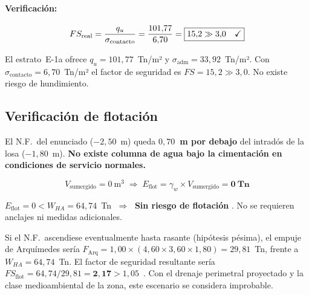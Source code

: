 \paragraph{Verificación:}
\begin{equation}
  FS_\text{real} = \frac{q_u}{\sigma_\text{contacto}}
    = \frac{101{,}77}{6{,}70}
    = \boxed{15{,}2 \gg 3{,}0 \quad \checkmark}
  \label{eq:fs_cp_arqueta}
\end{equation}

\begin{resultadobox}
  El estrato~E-1a ofrece $q_u=101{,}77$~Tn/m² y $\sigma_\text{adm}=33{,}92$~Tn/m².
  Con $\sigma_\text{contacto}=6{,}70$~Tn/m² el factor de seguridad es $FS=15{,}2\gg3{,}0$.
  No existe riesgo de hundimiento.
\end{resultadobox}

\subsection{Verificación de flotación}
\label{subsec:flotacion}

El N.F.\ del enunciado ($-2{,}50$~m) queda \textbf{$0{,}70$~m por debajo}
del intradós de la losa ($-1{,}80$~m). \textbf{No existe columna de agua bajo
la cimentación en condiciones de servicio normales.}

\[
  V_\text{sumergido} = 0~\text{m}^3
  \;\Rightarrow\;
  E_\text{flot} = \gamma_w\times V_\text{sumergido} = \mathbf{0~\text{Tn}}
\]

\begin{resultadobox}
  $E_\text{flot}=0 < W_{HA}=64{,}74$~Tn $\;\Rightarrow\;$
  \textbf{Sin riesgo de flotación} \checkmark.
  No se requieren anclajes ni medidas adicionales.
\end{resultadobox}

\begin{notabox}
  Si el N.F.\ ascendiese eventualmente hasta rasante (hipótesis pésima), el
  empuje de Arquímedes sería
  $F_\text{Arq} = 1{,}00\times(4{,}60\times3{,}60\times1{,}80) = 29{,}81$~Tn,
  frente a $W_{HA}=64{,}74$~Tn.
  El factor de seguridad resultante sería
  $FS_\text{flot}=64{,}74/29{,}81=\mathbf{2{,}17}>1{,}05$~\checkmark.
  Con el drenaje perimetral proyectado y la clase medioambiental de la zona,
  este escenario se considera improbable.
\end{notabox}


